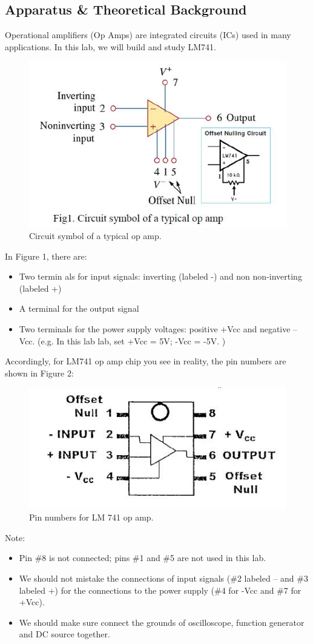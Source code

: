 \documentclass[a4paper]{report}
\begin{document}
	\subsection{Apparatus \& Theoretical Background}
	Operational amplifiers (Op Amps) are integrated circuits (ICs) used in many applications. In this lab, we will build and study LM741.
	\begin{figure}[H]
		\centering
		\includegraphics[width=0.8\linewidth]{1.jpg}
		\caption{Circuit symbol of a typical op amp.}
	\end{figure}
	In Figure 1, there are:
	\begin{itemize}
		\item Two termin als for input signals: inverting (labeled -) 	and non non-inverting (labeled +)
		\item A terminal for the output signal
		\item Two terminals for the power supply voltages: positive +Vcc and negative –Vcc. (e.g. In this lab lab, set +Vcc = 5V; -Vcc = -5V. )
	\end{itemize}
	
	Accordingly, for LM741 op amp chip you see in reality, the pin numbers are shown in Figure 2:
	\begin{figure}[H]
		\centering
		\includegraphics[width=0.8\linewidth]{2.jpg}
		\caption{Pin numbers for LM 741 op amp.}
	\end{figure}
	Note:
	\begin{itemize}
		\item Pin \#8 is not connected; pins \#1 and \#5 are not used in this lab.
		\item We should not mistake the connections of input signals (\#2 labeled – and \#3 labeled +) for the connections to the power supply (\#4 for -Vcc and \#7 for +Vcc).
		\item We should make sure connect the grounds of oscilloscope, function generator and DC source together.
	\end{itemize}
	
\end{document}
